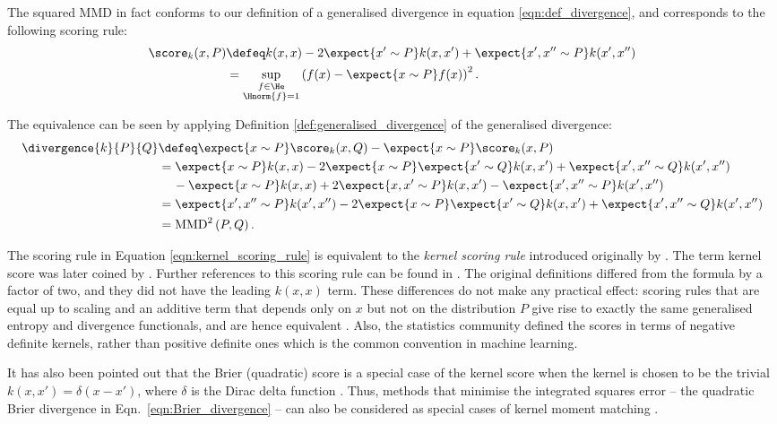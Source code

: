 The squared MMD in fact conforms to our definition of a generalised divergence in equation \eqref{eqn:def_divergence}, and corresponds to the following scoring rule:
%
\begin{align}
	\score_{k}(x,P) &\defeq k(x,x) - 2 \expect{x'\sim P} k(x,x') + \expect{x',x''\sim P}k(x',x'') \label{eqn:kernel_scoring_rule}\\
		&=  \sup_{\substack{f\in\He\\\Hnorm{f}=1}}\left( f(x)- \expect{x\sim P} f(x) \right)^2.
\end{align}

The equivalence can be seen by applying Definition \ref{def:generalised_divergence} of the generalised divergence:
%
\begin{align}
	\divergence{k}{P}{Q} &\defeq \expect{x\sim P} \score_{k}(x,Q) - \expect{x\sim P} \score_{k}(x,P)\\
		&= \expect{x\sim P} k(x,x) - 2 \expect{x\sim P}\expect{x'\sim Q} k(x,x') + \expect{x',x''\sim Q}k(x',x'')\\
		&\ \ \ \,- \expect{x\sim P} k(x,x) + 2 \expect{x,x'\sim P} k(x,x') - \expect{x',x''\sim P}k(x',x'') \\
		&= \expect{x',x''\sim P}k(x',x'') - 2 \expect{x\sim P}\expect{x'\sim Q} k(x,x') + \expect{x',x''\sim Q}k(x',x'')\\
		&= \mbox{MMD}^2\left(P,Q\right).
\end{align}

The scoring rule in Equation \eqref{eqn:kernel_scoring_rule} is equivalent to the \emph{kernel scoring rule} introduced originally by \citet{Eaton1982}. The term kernel score was later coined by \citet{Dawid2007}. Further references to this scoring rule can be found in \citep{Eaton1996,Gneiting2007}. The original definitions differed from the formula by a factor of two, and they did not have the leading $k(x,x)$ term. These differences do not make any practical effect: scoring rules that are equal up to scaling and an additive term that depends only on $x$ but not on the distribution $P$ give rise to exactly the same generalised entropy and divergence functionals, and are hence equivalent \citep{Dawid2007}. Also, the statistics community defined the scores in terms of negative definite kernels, rather than positive definite ones which is the common convention in machine learning.

It has also been pointed out that the Brier (quadratic) score is a special case of the kernel score when the kernel is chosen to be the trivial $k(x,x') = \delta(x - x')$, where $\delta$ is the Dirac delta function \citep{Dawid2007}.
\cbstart
Thus, methods that minimise the integrated squares error -- \ie the quadratic Brier divergence in Eqn.\ \eqref{eqn:Brier_divergence} -- can also be considered as special cases of kernel moment matching \citep{Scott99,Girolami03,Mukherjee99}.
\cbend

